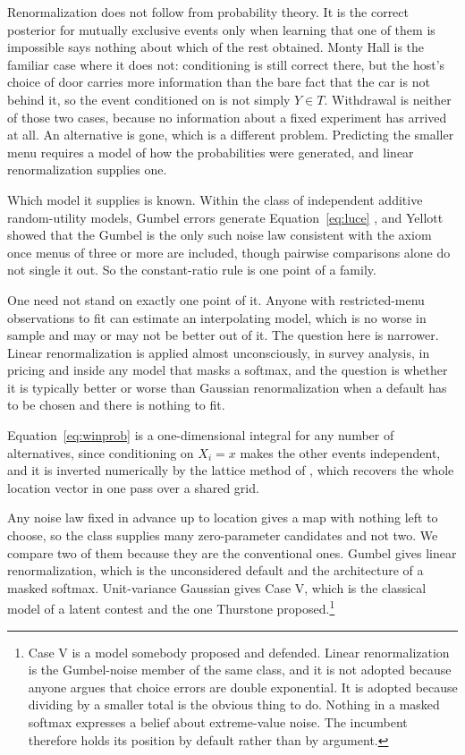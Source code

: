 \documentclass[11pt]{article}
\theoremstyle{italichead}
\begin{document}
Renormalization does not follow from probability theory. It is the correct posterior for
mutually exclusive events only when learning that one of them is impossible says nothing about
which of the rest obtained. Monty Hall is the familiar case where it does not: conditioning is
still correct there, but the host's choice of door carries more information than the bare fact
that the car is not behind it, so the event conditioned on is not simply $Y \in T$. Withdrawal is
neither of those two cases, because no information about a fixed experiment has arrived at all.
An alternative is gone, which is a different problem. Predicting the smaller menu requires a
model of how the probabilities were generated, and linear renormalization supplies one.

Which model it supplies is known. Within the class of independent additive random-utility
models, Gumbel errors generate Equation~\eqref{eq:luce}
\cite{lucesuppes1965,holman1974}, and Yellott \cite{yellott1977} showed that the Gumbel is the only
such noise law consistent with the axiom once menus of three or more are included, though
pairwise comparisons alone do not single it out. So the constant-ratio rule is one point of a family.

One need not stand on exactly one point of it. Anyone with restricted-menu observations to fit
can estimate an interpolating model, which is no worse in sample and may or may not be better
out of it. The question here is narrower.
Linear renormalization is applied almost unconsciously, in survey analysis, in pricing and inside
any model that masks a softmax, and the question is whether it is typically better or worse
than Gaussian renormalization when a default has to be chosen and there is nothing to fit.

Equation~\eqref{eq:winprob} is a one-dimensional integral for any number of alternatives,
since conditioning on $X_i = x$ makes the other events independent, and it is inverted
numerically by the lattice method of \cite{cotton2021}, which recovers the whole location
vector in one pass over a shared grid.

Any noise law fixed in advance up to location gives a map with nothing left to choose, so the
class supplies many zero-parameter candidates and not two. We compare two of them because they
are the conventional ones. Gumbel gives linear renormalization, which is the unconsidered default
and the architecture of a masked softmax. Unit-variance Gaussian gives Case V, which is the
classical model of a latent contest and the one Thurstone proposed.\setcounter{footnote}{8}\footnote{Case
V is a model somebody proposed and defended. Linear renormalization is the
Gumbel-noise member of the same class, and it is not adopted because anyone argues that choice
errors are double exponential. It is adopted because dividing by a smaller total is the obvious
thing to do. Nothing in a masked softmax expresses a belief about extreme-value noise. The
incumbent therefore holds its position by default rather than by argument.}
\end{document}
